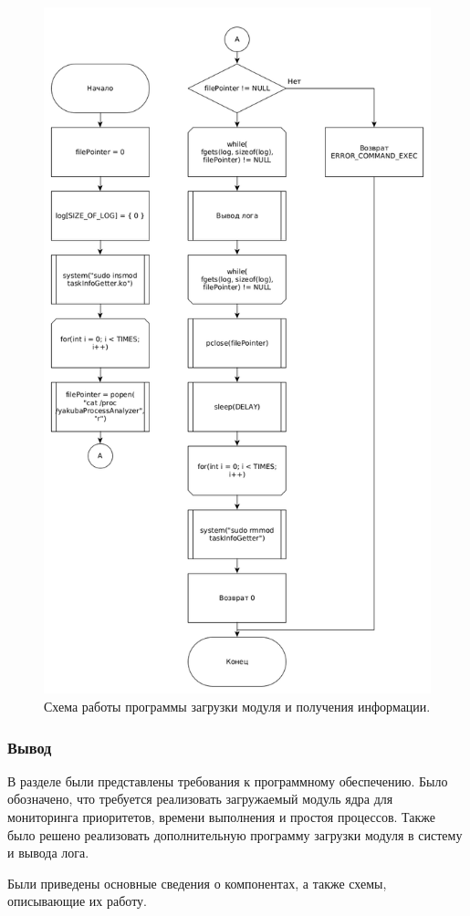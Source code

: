 \begin{figure}[H]
	\centering
	\includegraphics[scale=0.5]{img/starterLogger.png}
	\caption{Схема работы программы загрузки модуля и получения информации. }
	\label{fig:starterLogger}
\end{figure}

\subsubsection*{Вывод}
В разделе были представлены требования к программному обеспечению. Было обозначено, что требуется реализовать загружаемый модуль ядра для мониторинга приоритетов, времени выполнения и простоя процессов. Также было решено реализовать дополнительную программу загрузки модуля в систему и вывода лога.

Были приведены основные сведения о компонентах, а также схемы, описывающие их работу.

\pagebreak